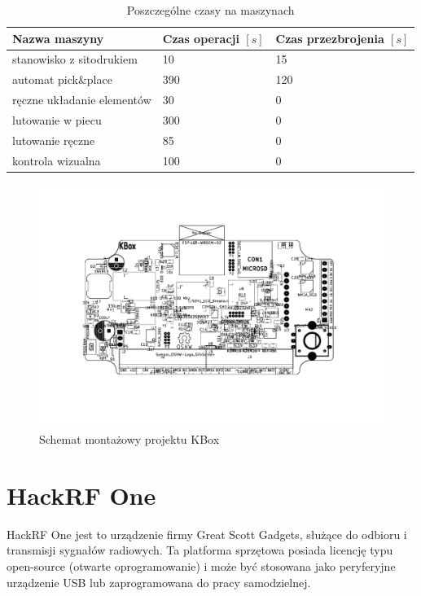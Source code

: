 \begin{table}[H]
	\centering
	\caption{Poszczególne czasy na maszynach}
	\begin{tabular}{lll}
		\toprule
		Nazwa maszyny                 & Czas operacji $[s]$ & Czas przezbrojenia $[s]$ \\
		\midrule
		stanowisko z sitodrukiem      & 10                  & 15                       \\
		automat pick\&place           & 390                 & 120                      \\
		ręczne układanie elementów & 30                  & 0                        \\
		lutowanie w piecu             & 300                 & 0                        \\
		lutowanie ręczne             & 85                  & 0                        \\
		kontrola wizualna             & 100                 & 0                        \\
		\bottomrule
	\end{tabular}
\end{table}

\begin{figure}[H]
	\centering
	\includegraphics[scale=0.7,clip, trim=3.8cm 4cm 3.8cm 3cm]{chapters/chapter5/kbox-rotated.pdf}
	\caption{Schemat montażowy projektu KBox}
	\label{kbox}
\end{figure}


\section{HackRF One}
HackRF One jest to urządzenie firmy Great Scott Gadgets, służące do odbioru i transmisji sygnałów radiowych. Ta platforma sprzętowa posiada licencję typu open-source (otwarte oprogramowanie) i może być stosowana jako peryferyjne urządzenie USB lub zaprogramowana do pracy samodzielnej.

